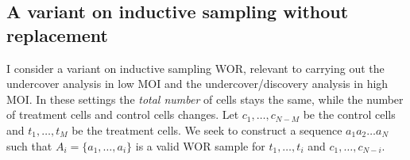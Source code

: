 \documentclass[12pt]{article}
\begin{document}
\subsection*{A variant on inductive sampling without replacement}

I consider a variant on inductive sampling WOR, relevant to carrying out the undercover analysis in low MOI and the undercover/discovery analysis in high MOI. In these settings the \textit{total number} of cells stays the same, while the number of treatment cells and control cells changes. Let $c_1, \dots, c_{N-M}$ be the control cells and $t_1, \dots, t_M$ be the treatment cells. We seek to construct a sequence $a_1 a_2 \dots a_N$ such that $A_i = \{a_1, \dots, a_i\}$ is a valid WOR sample for $t_1, \dots, t_i$ and $c_1, \dots, c_{N-i}$. 





\end{document}
